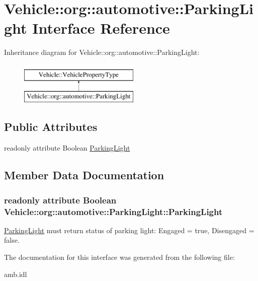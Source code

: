 \hypertarget{interfaceVehicle_1_1org_1_1automotive_1_1ParkingLight}{\section{Vehicle\-:\-:org\-:\-:automotive\-:\-:Parking\-Light Interface Reference}
\label{interfaceVehicle_1_1org_1_1automotive_1_1ParkingLight}
}
Inheritance diagram for Vehicle\-:\-:org\-:\-:automotive\-:\-:Parking\-Light\-:\begin{figure}[H]
\begin{center}
\leavevmode
\includegraphics[height=2.000000cm]{interfaceVehicle_1_1org_1_1automotive_1_1ParkingLight}
\end{center}
\end{figure}
\subsection*{Public Attributes}
\begin{DoxyCompactItemize}
\item 
readonly attribute Boolean \hyperlink{interfaceVehicle_1_1org_1_1automotive_1_1ParkingLight_ac4d510690276ef4b3ac41390fb593b4d}{Parking\-Light}
\end{DoxyCompactItemize}


\subsection{Member Data Documentation}
\hypertarget{interfaceVehicle_1_1org_1_1automotive_1_1ParkingLight_ac4d510690276ef4b3ac41390fb593b4d}{
\subsubsection[{Parking\-Light}]{\setlength{\rightskip}{0pt plus 5cm}readonly attribute Boolean Vehicle\-::org\-::automotive\-::\-Parking\-Light\-::\-Parking\-Light}}\label{interfaceVehicle_1_1org_1_1automotive_1_1ParkingLight_ac4d510690276ef4b3ac41390fb593b4d}
\hyperlink{interfaceVehicle_1_1org_1_1automotive_1_1ParkingLight}{Parking\-Light} must return status of parking light\-: Engaged = true, Disengaged = false. 

The documentation for this interface was generated from the following file\-:\begin{DoxyCompactItemize}
\item 
amb.\-idl\end{DoxyCompactItemize}
